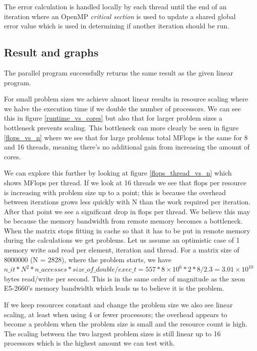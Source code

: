 \documentclass[a4paper,11pt]{article}
\begin{document}
The error calculation is handled locally by each thread until the end of an iteration where an OpenMP \emph{critical section} is used to update a shared global error value which is used in determining if another iteration should be run.

\subsection{Result and graphs}
The parallel program successfully returns the same result as the given linear program.

For small problem sizes we achieve almost linear results in resource scaling where we halve the execution time if we double the number of processors. We can see this in figure \ref{runtime_vs_cores} but also that for larger problem sizes a bottleneck prevents scaling. This bottleneck can more clearly be seen in figure \ref{flops_vs_n} where we see that for large problems total MFlops is the same for 8 and 16 threads, meaning there's no additional gain from increasing the amount of cores.

We can explore this further by looking at figure \ref{flops_thread_vs_n} which shows MFlops per thread. If we look at 16 threads we see that flops per resource is increasing with problem size up to a point; this is because the overhead between iterations grows less quickly with N than the work required per iteration. After that point we see a significant drop in flops per thread. We believe this may be because the memory bandwidth from remote memory becomes a bottleneck. When the matrix stops fitting in cache so that it has to be put in remote memory during the calculations we get problems. Let us assume an optimistic case of 1 memory write and read per element, iteration and thread. For a matrix size of 8000000 (N = 2828), where the problem starts, we have $n\_it*N^2*n\_accesses*size\_of\_double/exec\_t=557*8\times10^{6}*2*8/2.3=3.01\times10^{10}$ bytes read/write per second. This is in the same order of magnitude as the xeon E5-2660's memory bandwidth which leads us to believe it is the problem.

If we keep resources constant and change the problem size we also see linear scaling, at least when using 4 or fewer processors; the overhead appears to become a problem when the problem size is small and the resource count is high. The scaling between the two largest problem sizes is still linear up to 16 processors which is the highest amount we can test with.
\end{document}
